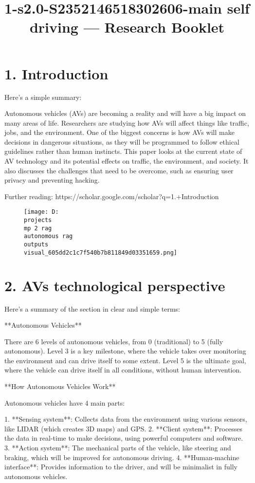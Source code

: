 \documentclass[12pt,a4paper]{article}
\title{1-s2.0-S2352146518302606-main self driving — Research Booklet}
\date{}
\begin{document}
\maketitle
\tableofcontents
\newpage
\section{1. Introduction}
Here's a simple summary:

Autonomous vehicles (AVs) are becoming a reality and will have a big impact on many areas of life. Researchers are studying how AVs will affect things like traffic, jobs, and the environment. One of the biggest concerns is how AVs will make decisions in dangerous situations, as they will be programmed to follow ethical guidelines rather than human instincts. This paper looks at the current state of AV technology and its potential effects on traffic, the environment, and society. It also discusses the challenges that need to be overcome, such as ensuring user privacy and preventing hacking.

Further reading: https://scholar.google.com/scholar?q=1.+Introduction
\begin{figure}[h]
\centering
\texttt{[image: D:\\projects\\mp 2 rag\\autonomous rag\\outputs\\visual\_605dd2c1c7f540b7b811849d03351659.png]}
\end{figure}
\section{2. AVs technological perspective}
Here's a summary of the section in clear and simple terms:

**Autonomous Vehicles**

There are 6 levels of autonomous vehicles, from 0 (traditional) to 5 (fully autonomous). Level 3 is a key milestone, where the vehicle takes over monitoring the environment and can drive itself to some extent. Level 5 is the ultimate goal, where the vehicle can drive itself in all conditions, without human intervention.

**How Autonomous Vehicles Work**

Autonomous vehicles have 4 main parts:

1. **Sensing system**: Collects data from the environment using various sensors, like LIDAR (which creates 3D maps) and GPS.
2. **Client system**: Processes the data in real-time to make decisions, using powerful computers and software.
3. **Action system**: The mechanical parts of the vehicle, like steering and braking, which will be improved for autonomous driving.
4. **Human-machine interface**: Provides information to the driver, and will be minimalist in fully autonomous vehicles.
\end{document}
